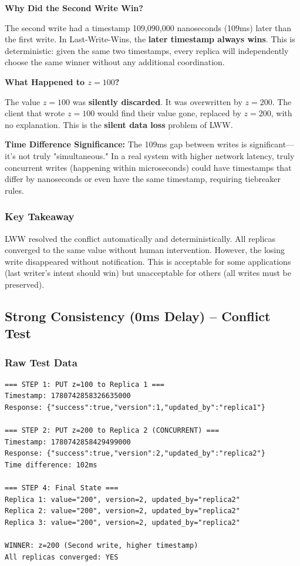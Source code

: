 \documentclass[10pt,a4paper]{article}
\begin{document}
\textbf{Why Did the Second Write Win?}

The second write had a timestamp 109,090,000 nanoseconds (109ms) later than the first write. In Last-Write-Wins, the \textbf{later timestamp always wins}. This is deterministic: given the same two timestamps, every replica will independently choose the same winner without any additional coordination.

\textbf{What Happened to $z=100$?}

The value $z=100$ was \textbf{silently discarded}. It was overwritten by $z=200$. The client that wrote $z=100$ would find their value gone, replaced by $z=200$, with no explanation. This is the \textbf{silent data loss} problem of LWW.

\textbf{Time Difference Significance:} The 109ms gap between writes is significant---it's not truly "simultaneous." In a real system with higher network latency, truly concurrent writes (happening within microseconds) could have timestamps that differ by nanoseconds or even have the same timestamp, requiring tiebreaker rules.

\subsubsection{Key Takeaway}

LWW resolved the conflict automatically and deterministically. All replicas converged to the same value without human intervention. However, the losing write disappeared without notification. This is acceptable for some applications (last writer's intent should win) but unacceptable for others (all writes must be preserved).

\subsection{Strong Consistency (0ms Delay) -- Conflict Test}

\subsubsection{Raw Test Data}

\begin{verbatim}
=== STEP 1: PUT z=100 to Replica 1 ===
Timestamp: 1780742858326635000
Response: {"success":true,"version":1,"updated_by":"replica1"}

=== STEP 2: PUT z=200 to Replica 2 (CONCURRENT) ===
Timestamp: 1780742858429499000
Response: {"success":true,"version":2,"updated_by":"replica2"}
Time difference: 102ms

=== STEP 4: Final State ===
Replica 1: value="200", version=2, updated_by="replica2"
Replica 2: value="200", version=2, updated_by="replica2"
Replica 3: value="200", version=2, updated_by="replica2"

WINNER: z=200 (Second write, higher timestamp)
All replicas converged: YES
\end{verbatim}
\end{document}
